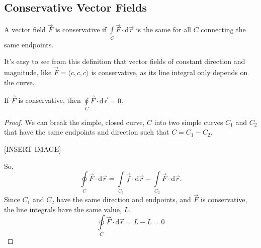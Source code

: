 \subsection{Conservative Vector Fields}
\begin{definition}
	A vector field $\vec{F}$ is conservative if $\int\limits_{C}{\vec{F} \cdot \mathrm{d}\vec{r}}$ is the same for all $C$ connecting the same endpoints.
\end{definition}

\noindent
It's easy to see from this definition that vector fields of constant direction and magnitude, like $\vec{F}=\langle c, c, c \rangle$ is conservative, as its line integral only depends on the curve.\\

\begin{theorem}
	If $\vec{F}$ is conservative, then $\oint\limits_{C}{\vec{F} \cdot \mathrm{d}\vec{r}} = 0$.
\end{theorem}
\begin{proof}
	We can break the simple, closed curve, $C$ into two simple curves $C_1$ and $C_2$ that have the same endpoints and direction such that $C = C_1-C_2$.
	
	[INSERT IMAGE]
	
	\noindent
	So, 
	\begin{equation*}
		\oint\limits_{C}{\vec{F} \cdot \mathrm{d}\vec{r}} = \int\limits_{C_1}{\vec{f} \cdot \mathrm{d}\vec{r}} - \int\limits_{C_2}{\vec{F} \cdot \mathrm{d}\vec{r}}.
	\end{equation*}
	Since $C_1$ and $C_2$ have the same direction and endpoints, and $\vec{F}$ is conservative, the line integrals have the same value, $L$.
	\begin{equation*}
		\oint\limits_{C}{\vec{F} \cdot \mathrm{d}\vec{r}} = L - L = 0
	\end{equation*}
\end{proof}